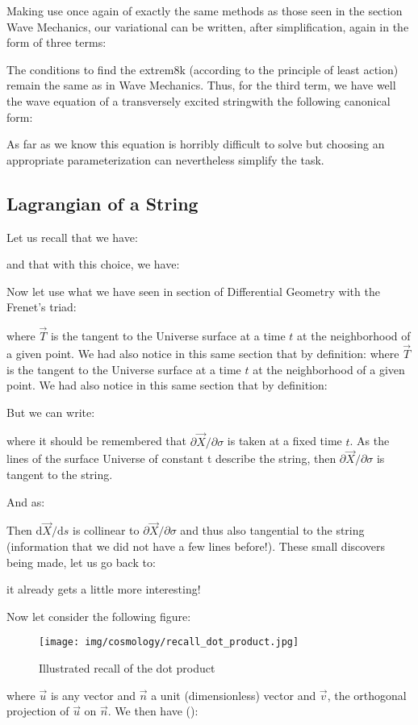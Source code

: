 	Making use once again of exactly the same methods as those seen in the section Wave Mechanics, our variational can be written, after simplification, again in the form of three terms:
	
	The conditions to find the extrem8k (according to the principle of least action) remain the same as in Wave Mechanics. Thus, for the third term, we have well the wave equation of a transversely excited stringwith the following canonical form:
	
	As far as we know this equation is horribly difficult to solve but choosing an appropriate parameterization can nevertheless simplify the task.
	
	\subsection{Lagrangian of a String}
	Let us recall that we have:
	
	and that with this choice, we have:
	
	Now let use what we have seen in section of Differential Geometry with the Frenet's triad:
	
	where $\vec{T}$ is the tangent to the Universe surface at a time $t$ at the neighborhood of a given point. We had also notice in this same section that by definition:
	where $\vec{T}$ is the tangent to the Universe surface at a time $t$ at the neighborhood of a given point. We had also notice in this same section that by definition:
	
	But we can write:
	
	where it should be remembered that $\partial \vec{X}/\partial \sigma$ is taken at a fixed time $t$. As the lines of the surface Universe of constant $ $t describe the string, then $\partial \vec{X}/\partial \sigma$ is tangent to the string.

	And as:
	
	Then $\mathrm{d}\vec{X}/\mathrm{d}s$ is collinear to $\partial \vec{X}/\partial \sigma$ and thus also tangential to the string (information that we did not have a few lines before!). These small discovers being made, let us go back to:
	
	it already gets a little more interesting!

	Now let consider the following figure:
	\begin{figure}[H]
		\begin{center}
		\texttt{[image: img/cosmology/recall\_dot\_product.jpg]}
		\end{center}	
		\caption[]{Illustrated recall of the dot product}
	\end{figure}
	where $\vec{u}$ is any vector and $\vec{n}$ a unit (dimensionless) vector and $\vec{v}$, the orthogonal projection of $\vec{u}$ on $\vec{n}$. We then have ():
	
